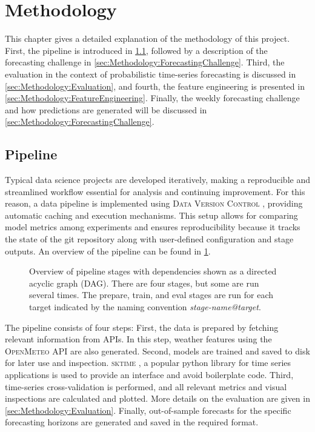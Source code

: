 \newpage
\section{Methodology}
\label{ch:Methodology}

This chapter gives a detailed explanation of the methodology of this project. First, the pipeline is introduced in \cref{sec:Methodology:Pipeline}, followed by a description of the forecasting challenge in \cref{sec:Methodology:ForecastingChallenge}. Third, the evaluation in the context of probabilistic time-series forecasting is discussed in \cref{sec:Methodology:Evaluation}, and fourth, the feature engineering is presented in \cref{sec:Methodology:FeatureEngineering}.
Finally, the weekly forecasting challenge and how predictions are generated will be discussed in \cref{sec:Methodology:ForecastingChallenge}.


\subsection{Pipeline}
\label{sec:Methodology:Pipeline}

Typical data science projects are developed iteratively, making a reproducible and streamlined workflow essential for analysis and continuing improvement. For this reason, a data pipeline is implemented using \textsc{Data Version Control} \parencite{ruslan_kuprieiev_dvc_2024}, providing automatic caching and execution mechanisms. This setup allows for comparing model metrics among experiments and ensures reproducibility because it tracks the state of the git repository along with user-defined configuration and stage outputs. An overview of the pipeline can be found in \cref{fig:pipeline}.
\begin{figure}[htbp]
  \centering
  
  \caption{Overview of pipeline stages with dependencies shown as a directed acyclic graph (DAG). There are four stages, but some are run several times. The prepare, train, and eval stages are run for each target indicated by the naming convention \textit{stage-name@target}.} 
  \label{fig:pipeline}
\end{figure}
The pipeline consists of four steps: First, the data is prepared by fetching relevant information from APIs. In this step, weather features using the \textsc{OpenMeteo} API are also generated. Second, models are trained and saved to disk for later use and inspection. \textsc{sktime} \parencite{franz_kiraly_sktimesktime_2024}, a popular python library for time series applications is used to provide an interface and avoid boilerplate code. Third, time-series cross-validation is performed, and all relevant metrics and visual inspections are calculated and plotted. More details on the evaluation are given in \cref{sec:Methodology:Evaluation}. Finally, out-of-sample forecasts for the specific forecasting horizons are generated and saved in the required format.

